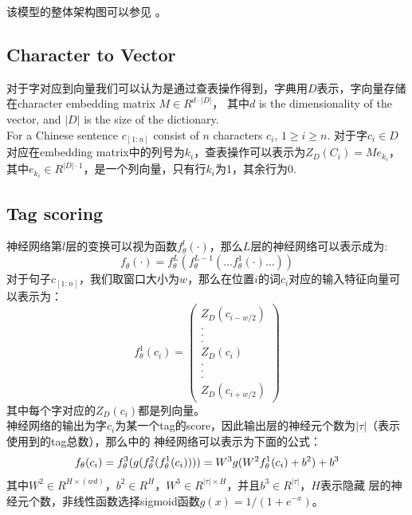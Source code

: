 \documentclass[UTF8]{ctexart}
\begin{document}
该模型的整体架构图可以参见 。

\subsection{Character to Vector}
对于字对应到向量我们可以认为是通过查表操作得到，字典用$D$表示，字向量存储在character embedding matrix $M \in R^{d \cdot |D|}$，
其中$d$ is the dimensionality of the vector, and $|D|$ is the size of the dictionary.
\\
For a Chinese sentence $c_{[1:n]}$ consist of $n$ characters $c_i$, $1 \geq i \geq n$. 对于字$c_i \in D$对应在embedding 
matrix中的列号为$k_i$，查表操作可以表示为$Z_D(C_i)=Me_{k_i}$，其中$e_{k_i} \in R^{|D| \cdot 1}$，是一个列向量，只有行$k_i$为1，其余行为0.

\subsection{Tag scoring}
神经网络第$l$层的变换可以视为函数$f_{\theta}^{l}(\cdot)$，那么$L$层的神经网络可以表示成为:
\begin{equation}
f_{\theta}(\cdot)=f_{\theta}^L(f_{\theta}^{L-1}(...f_{\theta}^1(\cdot)...))
\end{equation}
对于句子$c_{[1:n]}$，我们取窗口大小为$w$，那么在位置$i$的词$c_i$对应的输入特征向量可以表示为：
\begin{equation}
f_{\theta}^1(c_i)=\begin{pmatrix}
Z_D (c_{i-w/2}) \\ . \\ . \\ . \\ Z_D(c_i) \\ . \\ . \\ . \\Z_D(c_{i+w/2})
\end{pmatrix}
\end{equation}
其中每个字对应的$Z_D(c_i)$都是列向量。\\
神经网络的输出为字$c_i$为某一个tag的score，因此输出层的神经元个数为$|\tau|$（表示使用到的tag总数），那么中的
神经网络可以表示为下面的公式：
\begin{equation}
f_{\theta}(c_i)=f_{\theta}^3(g(f_{\theta}^2(f_{\theta}^1(c_i)))) \\
=W^3g(W^2f_{\theta}^1(c_i)+b^2)+b^3
\end{equation}
其中$W^2 \in R^{H \times (wd)}$，$b^2 \in R^H$，$W^3 \in R^{|\tau| \times H}$，并且$b^3 \in R^{|\tau|}$，$H$表示隐藏
层的神经元个数，非线性函数选择sigmoid函数$g(x)=1/(1+e^{-x})$。
\end{document}
